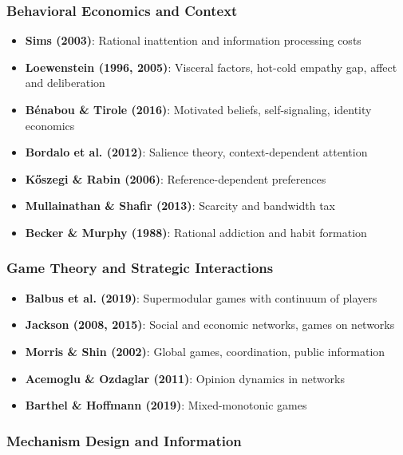 \subsubsection{Behavioral Economics and Context}

\begin{itemize}
    \item \textbf{Sims (2003)}: Rational inattention and information processing 
    costs
    \item \textbf{Loewenstein (1996, 2005)}: Visceral factors, hot-cold empathy 
    gap, affect and deliberation
    \item \textbf{Bénabou \& Tirole (2016)}: Motivated beliefs, self-signaling, 
    identity economics
    \item \textbf{Bordalo et al. (2012)}: Salience theory, context-dependent 
    attention
    \item \textbf{Kőszegi \& Rabin (2006)}: Reference-dependent preferences
    \item \textbf{Mullainathan \& Shafir (2013)}: Scarcity and bandwidth tax
    \item \textbf{Becker \& Murphy (1988)}: Rational addiction and habit formation
\end{itemize}

\subsubsection{Game Theory and Strategic Interactions}

\begin{itemize}
    \item \textbf{Balbus et al. (2019)}: Supermodular games with continuum of 
    players
    \item \textbf{Jackson (2008, 2015)}: Social and economic networks, games on 
    networks
    \item \textbf{Morris \& Shin (2002)}: Global games, coordination, public 
    information
    \item \textbf{Acemoglu \& Ozdaglar (2011)}: Opinion dynamics in networks
    \item \textbf{Barthel \& Hoffmann (2019)}: Mixed-monotonic games
\end{itemize}

\subsubsection{Mechanism Design and Information}

